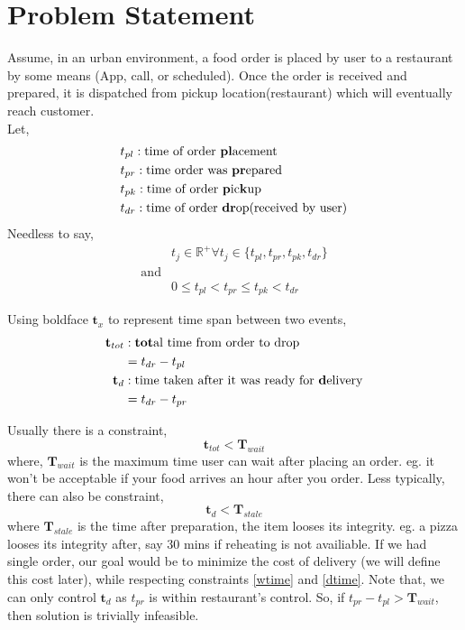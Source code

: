 \section{Problem Statement}
Assume, in an urban environment, a food order is placed by user to a restaurant by some means (App, call, or scheduled).
Once the order is received and prepared, it is dispatched from pickup location(restaurant) which will eventually reach 
customer. \\

Let,
\begin{align*}
    & t_{pl} : \text{time of order \textbf{pl}acement}\\
    & t_{pr}: \text{time order was \textbf{pr}epared}\\
    & t_{pk}: \text{time of order \textbf{p}ic\textbf{k}up}\\
    & t_{dr}: \text{time of order \textbf{dr}op(received by user)}\\
\end{align*}
Needless to say, 
\begin{align*}
    & t_j \in \mathbb{R^+} \forall t_j \in \{t_{pl}, t_{pr}, t_{pk}, t_{dr}\} \\
    \text{and} \\
    & 0 \leqslant t_{pl} < t_{pr} \leqslant t_{pk} < t_{dr}
\end{align*}

Using boldface $ \textbf{t}_x $ to represent time span between two events,
\begin{align*}
    \textbf{t}_{tot} & : \text{\textbf{tot}al time from order to drop} \\
    & = t_{dr} - t_{pl} \\
    \textbf{t}_{d} & : \text{time taken after it was ready for \textbf{d}elivery} \\
    & = t_{dr} - t_{pr}
\end{align*}

Usually there is a constraint,
\begin{equation}
    \textbf{t}_{tot}<\textbf{T}_{wait}  \label{wtime}
\end{equation}
where, $\textbf{T}_{wait}$ is the maximum time user can wait after placing an order.
eg. it won't be acceptable if your food arrives an hour after you order.
Less typically, there can also be constraint, 
\begin{equation}
    \textbf{t}_{d} < \textbf{T}_{stale}  \label{dtime}
\end{equation}
where $\textbf{T}_{stale}$ is the time after preparation, the item looses its integrity.
eg. a pizza looses its integrity after, say 30 mins if reheating is not availiable. If we had single order,
our goal would be to minimize the cost of delivery (we will define this cost later), while respecting constraints 
\eqref{wtime} and \eqref{dtime}. Note that, we can only control $\textbf{t}_{d}$ as $t_{pr}$ is within restaurant's control. 
So, if $t_{pr}-t_{pl}>\textbf{T}_{wait}$, then solution is trivially infeasible.

